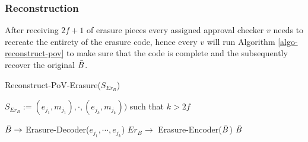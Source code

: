 



\subsubsection{Reconstruction}
\label{}
After receiving $2f+1$ of erasure pieces every assigned approval checker $v$ needs to recreate the entirety of the erasure code, hence every $v$ will run Algorithm \ref{algo-reconstruct-pov} to make sure that the code is complete and the subsequently recover the original $\bar{B}$.

\begin{algorithm}
  \caption[Reconstruct-PoV-Erasure]{\sc Reconstruct-PoV-Erasure($S_{Er_B}$)}
  \label{algo-reconstruct-pov-erasure}
  \begin{algorithmic}[1]
  \Require
    $S_{Er_B} := {(e_{j_1}, m_{j_1}),\cdot,(e_{j_k}, m_{j_k}))}$ such that $k > 2f$
    
    \State $\bar{B} \rightarrow$ {\sc Erasure-Decoder}(${e_{j_1},\cdots, e_{j_k}}$)
        \State \Return
    \EndIf
    \State $Er_B \rightarrow$ {\sc Erasure-Encoder}($\bar{B}$)
      \State \Return
    \EndIf
    \State \Return $\bar{B}$
  \end{algorithmic}
\end{algorithm}

